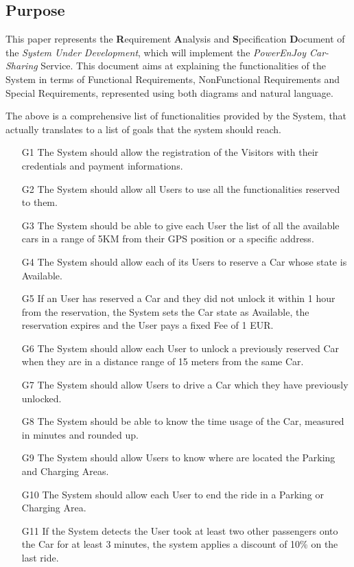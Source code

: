 \subsection{Purpose}
This paper represents the \textbf{R}equirement \textbf{A}nalysis and \textbf{S}pecification \textbf{D}ocument of the \textit{System Under Development}, which will implement the \emph{PowerEnJoy Car-Sharing} Service. This document aims at explaining the functionalities of the System in terms of Functional Requirements, NonFunctional Requirements and Special Requirements, represented using both diagrams and natural language.

The above is a comprehensive list of functionalities provided by the System, that actually translates to a list of goals that the system should reach.

\begin{enumerate}
	\item[G1] The System should allow the registration of the Visitors with their credentials and payment informations.
	\item[G2] The System should allow all Users to use all the functionalities reserved to them.
	\item[G3] The System should be able to give each User the list of all the available cars in a range of 5KM from their GPS position or a specific address.
	\item[G4] The System should allow each of its Users to reserve a Car whose state is Available.
	\item[G5] If an User has reserved a Car and they did not unlock it within 1 hour from the reservation, the System sets the Car state as Available, the reservation expires and the User pays a fixed Fee of 1 EUR.  
	\item[G6] The System should allow each User to unlock a previously reserved Car when they are in a distance range of 15 meters from the same Car.
	\item[G7] The System should allow Users to drive a Car which they have previously unlocked.
	\item[G8] The System should be able to know the time usage of the Car, measured in minutes and rounded up.
	\item[G9] The System should allow Users to know where are located the Parking and Charging Areas.
	\item[G10] The System should allow each User to end the ride in a Parking or Charging Area.
	\item[G11] If the System detects the User took at least two other passengers onto the Car for at least 3 minutes, the system applies a discount of 10\% on the last ride. 

\end{enumerate}
